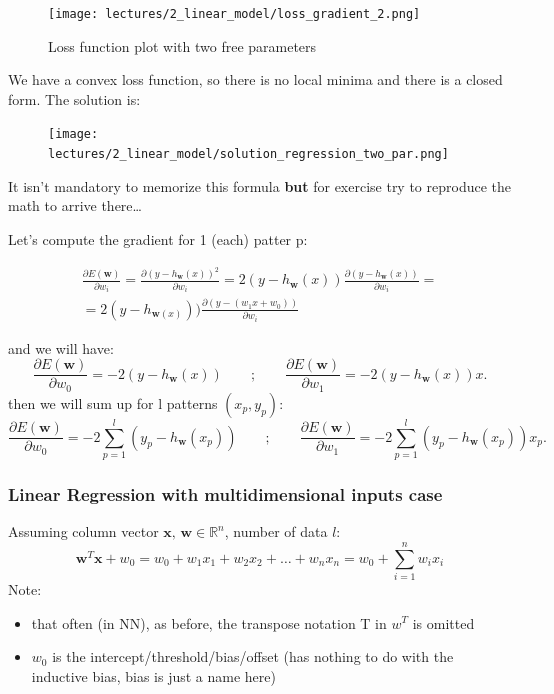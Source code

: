 \documentclass[../main.tex]{subfiles}
\begin{document}
\begin{figure}
    \centering
    \texttt{[image: lectures/2\_linear\_model/loss\_gradient\_2.png]}
    \caption{Loss function plot with two free parameters}
    \label{fig:loss_gradient_2}
\end{figure}

We have a convex loss function, so there is no local minima and there is a closed form. The solution is:
\begin{figure}[H]
    \centering
    \texttt{[image: lectures/2\_linear\_model/solution\_regression\_two\_par.png]}
\end{figure}
It isn't mandatory to memorize this formula \textbf{but} for exercise try to reproduce the math to arrive there\ldots

Let's compute the gradient for 1 (each) patter p:

\begin{equation*}\label{eq:pareto mle2}
    \begin{aligned}
    \frac{\partial E(\mathbf{w})}{\partial{w_i}} = \frac{\partial(y-h_{\textbf{w}}(x))^2}{\partial{w_i}} =
    2(y-h_{\textbf{w}}(x))\frac{\partial(y-h_{\textbf{w}}(x))}{\partial{w_i}} =\\
    =2(y-h_{\textbf{w}(x)}))\frac{\partial(y-(w_1x+w_0))}{\partial{w_i}}
    \end{aligned}
\end{equation*}

and we will have:
\[
\frac{\partial E(\mathbf{w})}{\partial{w_0}} = -2(y - h_{\mathbf{w}}(x))  \qquad;\qquad \frac{\partial E(\mathbf{w})}{\partial{w_1}} = -2(y - h_{\mathbf{w}}(x))x
.\] 
then we will sum up for l patterns $(x_p,y_p)$:
\[
\frac{\partial E(\mathbf{w})}{\partial{w_0}} = -2\sum_{p = 1}^{l}(y_p - h_{\mathbf{w}}(x_p)) \qquad;\qquad \frac{\partial E(\mathbf{w})}{\partial{w_1}} = -2\sum_{p = 1}^{l}(y_p - h_{\mathbf{w}}(x_p))x_p
.\] 

\subsubsection{Linear Regression with multidimensional inputs case}
Assuming column vector $\mathbf{x},\, \mathbf{w} \in \mathbb{R}^n$, number of data $l$:
$$
\mathbf{w}^T\mathbf{x} + w_0 = w_0 +w_1 x_1 + w_2 x_2 + \dots + w_n x_n = w_0 + \sum_{i=1}^{n} w_i x_i
$$
Note:
\begin{itemize}
    \item that often (in NN), as before, the transpose notation T in $w^T$ is omitted
    \item $w_0$ is the intercept/threshold/bias/offset (has nothing to do with the inductive bias, bias is just a name here)
\end{itemize}
\end{document}
